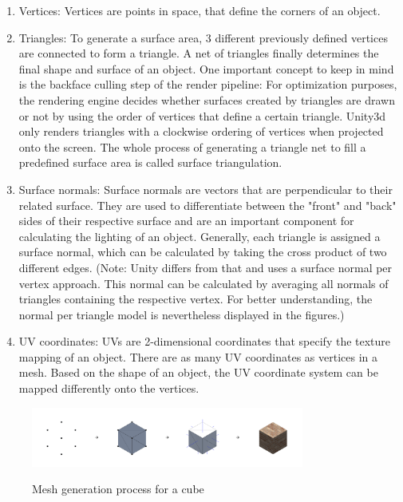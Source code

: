 \begin{enumerate}
	\item Vertices: Vertices are points in space, that define the corners of an object.
	\item Triangles: To generate a surface area, 3 different previously defined vertices are connected to form a triangle. A net of triangles finally determines the final shape and surface of an object. One important concept to keep in mind is the backface culling step of the render pipeline: For optimization purposes, the rendering engine decides whether surfaces created by triangles are drawn or not by using the order of vertices that define a certain triangle. Unity3d only renders triangles with a clockwise ordering of vertices when projected onto the screen. The whole process of generating a triangle net to fill a predefined surface area is called surface triangulation.
	\item Surface normals: Surface normals are vectors that are perpendicular to their related surface. They are used to differentiate between the "front" and "back" sides of their respective surface and are an important component for calculating the lighting of an object. Generally, each triangle is assigned a surface normal, which can be calculated by taking the cross product of two different edges. (Note: Unity differs from that and uses a surface normal per vertex approach. This normal can be calculated by averaging all normals of triangles containing the respective vertex. For better understanding, the normal per triangle model is nevertheless displayed in the figures.)
	\item UV coordinates: UVs are 2-dimensional coordinates that specify the texture mapping of an object. There are as many UV coordinates as vertices in a mesh. Based on the shape of an object, the UV coordinate system can be mapped differently onto the vertices.
\end{enumerate}

\begin{figure}[H]
	\centering
	\includegraphics[width=0.8\textwidth]{images/mesh_generation_process.png}\\
	\caption{Mesh generation process for a cube}
\end{figure}

